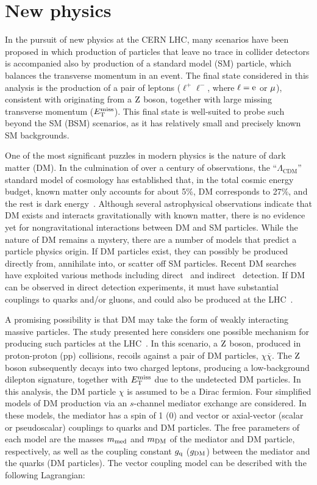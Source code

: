 \section{New physics}
In the pursuit of new physics at the CERN LHC, many scenarios have been proposed in which production of
particles that leave no trace in collider detectors
is accompanied also by production of a standard model (SM) particle, which balances the transverse momentum in an event.
The final state considered in this analysis is the production of a pair of leptons ($\ell^{+}\ell^{-}$, where $\ell=\mathrm{e}$ or $\mathrm{\mu}$),
consistent with originating from a $\mathrm{Z}$ boson, together with large missing transverse momentum ($E_\mathrm{T}^{\mathrm{miss}}$).
This final state is well-suited to probe such beyond the SM (BSM) scenarios, as
it has relatively small and precisely known SM backgrounds.

One of the most significant puzzles in modern physics is the nature of dark matter (DM).
In the culmination of over a century of observations, the ``$\Lambda_{\mathrm{CDM}}$'' standard model of cosmology
has established that, in the total cosmic energy budget,
known matter only accounts for about 5\%, DM corresponds to 27\%, and the rest is dark energy~\cite{2013ApJS..208...19H}.
Although several astrophysical observations indicate that DM exists and interacts gravitationally with known matter,
there is no evidence yet for nongravitational interactions between DM and SM particles.
While the nature of DM remains a mystery, there are a number of models that predict a particle physics origin. 
If DM particles exist, they can possibly be produced directly from, annihilate into, or scatter off SM particles.
Recent DM searches have exploited various methods including direct~\cite{Cushman:2013zza} and indirect~\cite{Buckley:2013bha} detection.
If DM can be observed in direct detection experiments,
it must have substantial couplings to quarks and/or gluons, and could also be produced at the LHC~\cite{Beltran:2010ww,Goodman:2010yf,Bai:2010hh,Goodman:2010ku,Fox:2011pm,Rajaraman:2011wf}.

A promising possibility is that DM may take the form of weakly interacting massive particles.
The study presented here considers one possible mechanism for producing such particles at the LHC~\cite{Abercrombie:2015wmb}.
In this scenario, a $\mathrm{Z}$ boson, produced in proton-proton (pp) collisions, recoils against a pair of DM particles, $\chi\overline\chi$. The $\mathrm{Z}$ boson subsequently decays into
two charged leptons, producing a low-background dilepton signature, together with $E_\mathrm{T}^{\mathrm{miss}}$
due to the undetected DM particles. In this analysis, the DM particle $\chi$ is assumed to be a Dirac fermion.
Four simplified models of DM production via an $s$-channel mediator exchange are considered.
In these models, the mediator has a spin of 1 (0) and vector or axial-vector (scalar or pseudoscalar) couplings to quarks and DM particles.
The free parameters of each model are the masses $m_{\rm med}$ and $m_{\rm DM}$ of the mediator and DM particle, respectively, as well as the coupling
constant $g_{\mathrm{q}}$ ($g_{\rm DM}$) between the mediator and the quarks (DM particles).
The vector coupling model can be described with the following Lagrangian:

